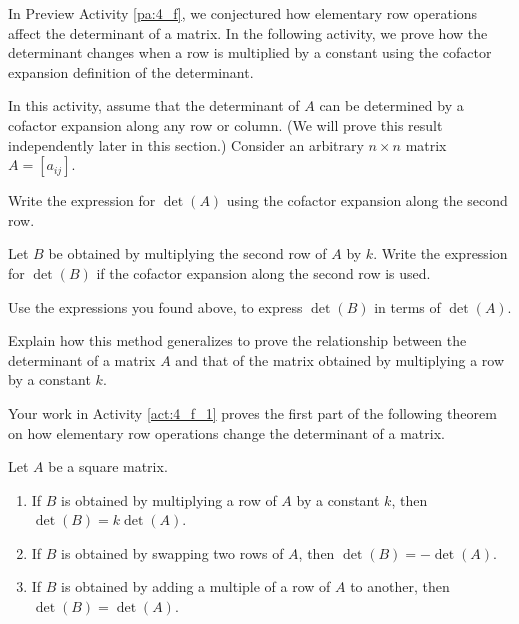 \label{sec:det_row_ops}

In Preview Activity \ref{pa:4_f}, we conjectured how elementary row operations affect the determinant of a matrix. In the following activity, we prove how the determinant changes when a row is multiplied by a constant using the cofactor expansion definition of the determinant.


\begin{activity} \label{act:4_f_1} In this activity, assume that the determinant of $A$ can be determined by a cofactor expansion along any row or column. (We will prove this result independently later in this section.) Consider an arbitrary $n \times n$ matrix $A = [a_{ij}]$. 
	\ba
	\item  

		\item Write the expression for $\det(A)$ using the cofactor expansion along the second row.


	
		\item Let $B$ be obtained by multiplying the second row of $A$ by $k$. Write the expression for $\det(B)$ if the cofactor expansion along the second row is used.



		\item Use the expressions you found above, to express $\det(B)$ in terms of $\det(A)$.

 

		\item Explain how this method generalizes to prove the relationship between the determinant of a matrix $A$ and that of the matrix obtained by multiplying a row by a constant $k$.
	

	
	\ea

\end{activity}



Your work in Activity \ref{act:4_f_1} proves the first part of the following theorem on how elementary row operations change the determinant of a matrix. 

\begin{theorem} \label{thm:4_f_1} Let $A$ be a square matrix. 
\begin{enumerate}
\item If $B$ is obtained by multiplying a row of $A$ by a constant $k$, then $\det(B)=k\det(A)$.
\item If $B$ is obtained by swapping two rows of $A$, then $\det(B)=-\det(A)$.
\item If $B$ is obtained by adding a multiple of a row of $A$ to another, then $\det(B)=\det(A)$.
\end{enumerate}
\end{theorem}

